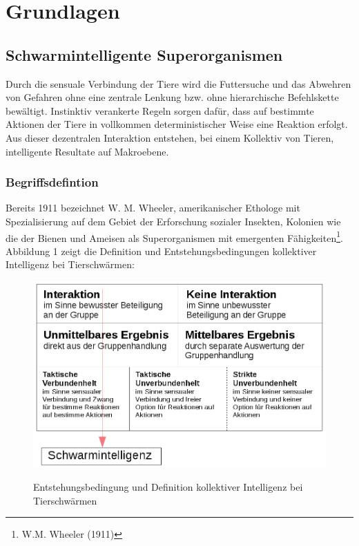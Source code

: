 \documentclass[a4paper, 11pt]{article}
\begin{document}
\section{Grundlagen}
\subsection{Schwarmintelligente Superorganismen}
Durch die sensuale Verbindung der Tiere wird die Futtersuche und das Abwehren von Gefahren ohne eine zentrale Lenkung bzw. ohne hierarchische Befehlskette bewältigt. Instinktiv verankerte Regeln sorgen dafür, dass auf bestimmte Aktionen der Tiere in vollkommen deterministischer Weise eine Reaktion erfolgt. Aus dieser dezentralen Interaktion entstehen, bei einem Kollektiv von Tieren, intelligente Resultate auf Makroebene.
\subsubsection{Begriffsdefintion}
Bereits 1911 bezeichnet W. M. Wheeler, amerikanischer Ethologe mit Spezialisierung auf dem Gebiet der Erforschung sozialer Insekten, Kolonien wie die der Bienen und Ameisen als Superorganismen mit emergenten Fähigkeiten\footnote{W.M. Wheeler (1911)}. Abbildung 1 zeigt die Definition und Entstehungsbedingungen kollektiver Intelligenz bei Tierschwärmen:\newline
\begin{figure}[h]
	\begin{center}
	\includegraphics[width=1\textwidth]{schwarmintelligenz}
		\label{defabb}
	\end{center}
	\hspace{1in}\parbox{4in}{\caption[Entstehungsbedingung und Definition kollektiver Intelligenz bei Tierschwärmen]{Entstehungsbedingung und Definition kollektiver Intelligenz bei Tierschwärmen\footnotemark}}
\end{figure}
\end{document}
